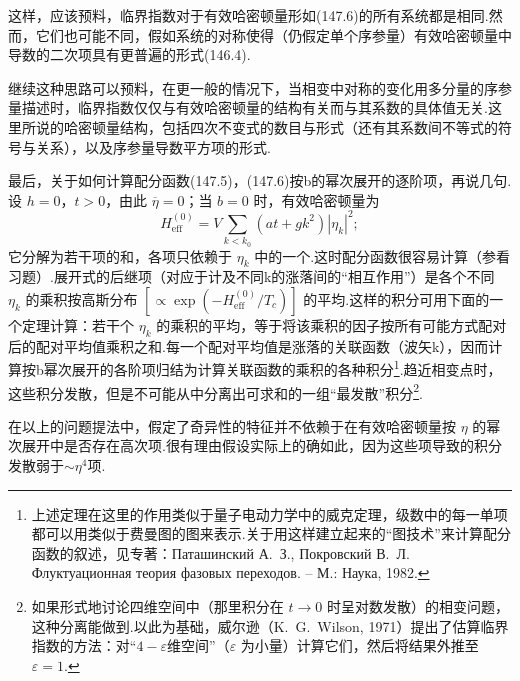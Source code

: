 这样，应该预料，临界指数对于有效哈密顿量形如(147.6)的所有系统都是相同.然而，它们也可能不同，假如系统的对称使得（仍假定单个序参量）有效哈密顿量中导数的二次项具有更普遍的形式(146.4).

继续这种思路可以预料，在更一般的情况下，当相变中对称的变化用多分量的序参量描述时，临界指数仅仅与有效哈密顿量的结构有关而与其系数的具体值无关.这里所说的哈密顿量结构，包括四次不变式的数目与形式（还有其系数间不等式的符号与关系），以及序参量导数平方项的形式.

最后，关于如何计算配分函数(147.5)，(147.6)按b的幂次展开的逐阶项，再说几句.设 $h=0$，$t>0$，由此 $\overline{\eta}=0$；当 $b=0$ 时，有效哈密顿量为
\begin{equation}
  H_{\mathrm{eff}}^{(0)}=V\sum_{k<k_0}(at+gk^2)\left|\eta_k\right|^2;
\end{equation}
它分解为若干项的和，各项只依赖于 $\eta_k$ 中的一个.这时配分函数很容易计算（参看习题）.展开式的后继项（对应于计及不同k的涨落间的“相互作用”）是各个不同 $\eta_k$ 的乘积按高斯分布 $[\propto\exp(-H_{\mathrm{eff}}^{(0)}/T_c)]$ 的平均.这样的积分可用下面的一个定理计算：若干个 $\eta_k$ 的乘积的平均，等于将该乘积的因子按所有可能方式配对后的配对平均值乘积之和.每一个配对平均值是涨落的关联函数（波矢k），因而计算按b幂次展开的各阶项归结为计算关联函数的乘积的各种积分\footnote{上述定理在这里的作用类似于量子电动力学中的威克定理，级数中的每一单项都可以用类似于费曼图的图来表示.关于用这样建立起来的“图技术”来计算配分函数的叙述，见专著：Паташинский А.~З., Покровский В.~Л. Флуктуационная теория фазовых переходов. – М.: Наука, 1982.}.趋近相变点时，这些积分发散，但是不可能从中分离出可求和的一组“最发散”积分\footnote{如果形式地讨论四维空间中（那里积分在 $t\to0$ 时呈对数发散）的相变问题，这种分离能做到.以此为基础，威尔逊（K.~G.~Wilson, 1971）提出了估算临界指数的方法：对“$4-\varepsilon$维空间”（$\varepsilon$ 为小量）计算它们，然后将结果外推至 $\varepsilon=1$.}.

在以上的问题提法中，假定了奇异性的特征并不依赖于在有效哈密顿量按 $\eta$ 的幂次展开中是否存在高次项.很有理由假设实际上的确如此，因为这些项导致的积分发散弱于$\sim\eta^4$项.

